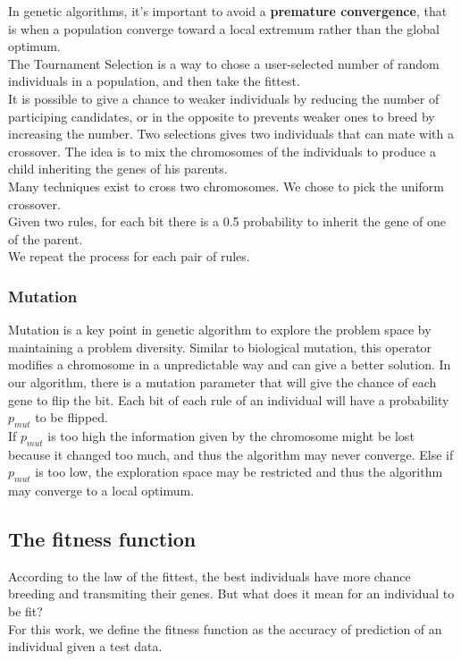 \documentclass[a4paper,12pt]{article}
\begin{document}
In genetic algorithms, it's important to avoid a \textbf{premature convergence}, that is when a population converge toward a local extremum rather than the global optimum. \\
The Tournament Selection is a way to chose a user-selected number of random individuals in a population, and then take the fittest.\\
It is possible to give a chance to weaker individuals by reducing the number of participing candidates, or in the opposite to prevents weaker ones to breed by increasing the number.
Two selections gives two individuals that can mate with a crossover.
The idea is to mix the chromosomes of the individuals to produce a child inheriting the genes of his parents.\\
Many techniques exist to cross two chromosomes. We chose to pick the uniform crossover.\\
Given two rules, for each bit there is a 0.5 probability to inherit the gene of one of the parent.\\
We repeat the process for each pair of rules.

\subsubsection{Mutation}

Mutation is a key point in genetic algorithm to explore the problem space by maintaining a problem diversity. Similar to biological mutation, this operator modifies a chromosome in a unpredictable way and can give a better solution.
In our algorithm, there is a mutation parameter that will give the chance of each gene to flip the bit. Each bit of each rule of an individual will have a probability $p_{mut}$ to be flipped.\\
If $p_{mut}$ is too high the information given by the chromosome might be lost because it changed too much, and thus the algorithm may never converge. Else if $p_{mut}$ is too low, the exploration space may be restricted and thus the algorithm may converge to a local optimum.


\subsection{The fitness function}

According to the law of the fittest, the best individuals have more chance breeding and transmiting their genes. But what does it mean for an individual to be fit?\\
For this work, we define the fitness function as the accuracy of prediction of an individual given a test data.
\end{document}
